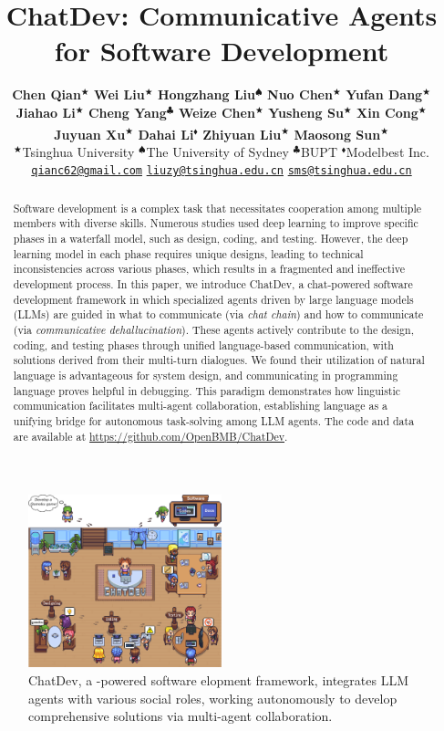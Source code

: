 \documentclass[11pt]{article}
\title{ChatDev: Communicative Agents for Software Development}
\author{
  \textbf{Chen Qian}{\footnotesize $^\bigstar$} \quad 
  \textbf{Wei Liu}{\footnotesize $^\bigstar$} \quad 
  \textbf{Hongzhang Liu}{\footnotesize $^\spadesuit$} \quad 
  \textbf{Nuo Chen}{\footnotesize $^\bigstar$} \quad 
  \textbf{Yufan Dang}{\footnotesize $^\bigstar$} \\
  \textbf{Jiahao Li}{\footnotesize $^\bigstar$} \quad 
  \textbf{Cheng Yang}{\footnotesize $^\clubsuit$} \quad 
  \textbf{Weize Chen}{\footnotesize $^\bigstar$} \quad 
  \textbf{Yusheng Su}{\footnotesize $^\bigstar$} \quad 
  \textbf{Xin Cong}{\footnotesize $^\bigstar$} \\
  \textbf{Juyuan Xu}{\footnotesize $^{\bigstar}$} \quad 
  \textbf{Dahai Li}{\footnotesize $^{\blacklozenge}$} \quad 
  \textbf{Zhiyuan Liu}{\footnotesize $^{\bigstar}$\textsuperscript{\Letter}} \quad  
  \textbf{Maosong Sun}{\footnotesize $^{\bigstar}$\textsuperscript{\Letter}} \\
  {\footnotesize $^\bigstar$}Tsinghua University \quad
  {\footnotesize $^\spadesuit$}The University of Sydney \quad 
  {\footnotesize $^\clubsuit$}BUPT \quad 
  {\footnotesize $^\blacklozenge$}Modelbest Inc.\\
  \href{mailto:qianc62@gmail.com}{\texttt{qianc62@gmail.com}} \quad 
  \href{mailto:liuzy@tsinghua.edu.cn}{\texttt{liuzy@tsinghua.edu.cn}} \quad 
  \href{mailto:sms@tsinghua.edu.cn}{\texttt{sms@tsinghua.edu.cn}}
}
\newcommand\footnoteONLYtext[1]{
    \let \mybackup \thefootnote
    \let \thefootnote \relax
    \footnotetext{#1}
    \let \thefootnote \mybackup
    \let \mybackup \imareallyundefinedcommand}
\begin{document}
\maketitle
\footnoteONLYtext{\Letter: Corresponding Author.}

\begin{abstract}
Software development is a complex task that necessitates cooperation among multiple members with diverse skills.
Numerous studies used deep learning to improve specific phases in a waterfall model, such as design, coding, and testing.
However, the deep learning model in each phase requires unique designs, leading to technical inconsistencies across various phases, which results in a fragmented and ineffective development process.
In this paper, we introduce ChatDev, a chat-powered software development framework in which specialized agents driven by large language models (LLMs) are guided in what to communicate (via \textit{chat chain}) and how to communicate (via \textit{communicative dehallucination}). These agents actively contribute to the design, coding, and testing phases through unified language-based communication, with solutions derived from their multi-turn dialogues.
We found their utilization of natural language is advantageous for system design, and communicating in programming language proves helpful in debugging.
This paradigm demonstrates how linguistic communication facilitates multi-agent collaboration, establishing language as a unifying bridge for autonomous task-solving among LLM agents.
The code and data are available at \url{https://github.com/OpenBMB/ChatDev}.
\end{abstract}

\begin{figure}[t]
  \centering
  \includegraphics[width=0.50\textwidth]{figs/ChatDev.pdf}
  \caption{ChatDev, a -powered software elopment framework, integrates LLM agents with various social roles, working autonomously to develop comprehensive solutions via multi-agent collaboration.}
  \label{fig:chatdev}
\end{figure}
\end{document}
